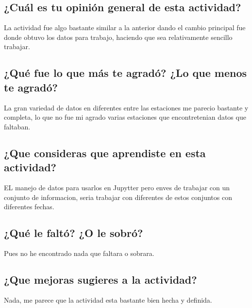 \documentclass{article}
\begin{document}
\subsection{¿Cuál es tu opinión general de esta actividad?}
La actividad fue algo bastante similar a la anterior dando el cambio principal fue donde obtuvo los datos para trabajo, haciendo que sea relativamente sencillo trabajar.
\subsection{¿Qué fue lo que más te agradó? ¿Lo que menos te agradó?}
La gran variedad de datos en diferentes entre las estaciones me parecio bastante y completa, lo que no fue mi agrado varias estaciones que encontretenian datos que faltaban.
\subsection{¿Que consideras que aprendiste en esta actividad? }
EL manejo de datos para usarlos en Jupytter pero enves de trabajar con un conjunto de informacion, seria trabajar con diferentes de estos conjuntos con diferentes fechas.
\subsection{¿Qué le faltó? ¿O le sobró? }
Pues no he encontrado nada que faltara o sobrara.
\subsection{¿Que mejoras sugieres a la actividad?}
Nada, me parece que la actividad esta bastante bien hecha y definida.
\end{document}
